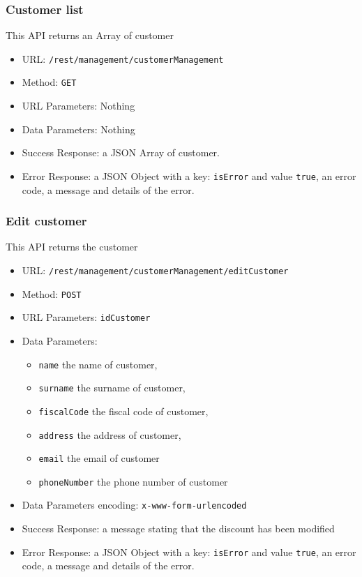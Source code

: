 \subsubsection*{Customer list}
This API returns an Array of customer

\begin{itemize}
    \item URL: \texttt{/rest/management/customerManagement}
    \item Method: \texttt{GET}
    \item URL Parameters: Nothing
    \item Data Parameters: Nothing
    \item Success Response: a JSON Array of customer.
    \item Error Response: a JSON Object with a key: \texttt{isError}  and value \texttt{true}, an error code, a message and details of the error.
\end{itemize}

\subsubsection*{Edit customer}
This API returns the customer
\begin{itemize}
    \item URL: \texttt{/rest/management/customerManagement/editCustomer}
    \item Method: \texttt{POST}
    \item URL Parameters: \texttt{idCustomer}
    \item Data Parameters: \begin{itemize}
       \item \texttt{name} the name of customer,
       \item \texttt{surname}  the surname of customer,
       \item \texttt{fiscalCode}  the fiscal code of customer,
       \item \texttt{address} the address of customer,
       \item \texttt{email} the email of customer
       \item \texttt{phoneNumber} the phone number of customer
    \end{itemize}
    \item Data Parameters encoding: \texttt{x-www-form-urlencoded}
    \item Success Response: a message stating that the discount has been modified
    \item Error Response: a JSON Object with a key: \texttt{isError}  and value \texttt{true}, an error code, a message and details of the error.
\end{itemize}

